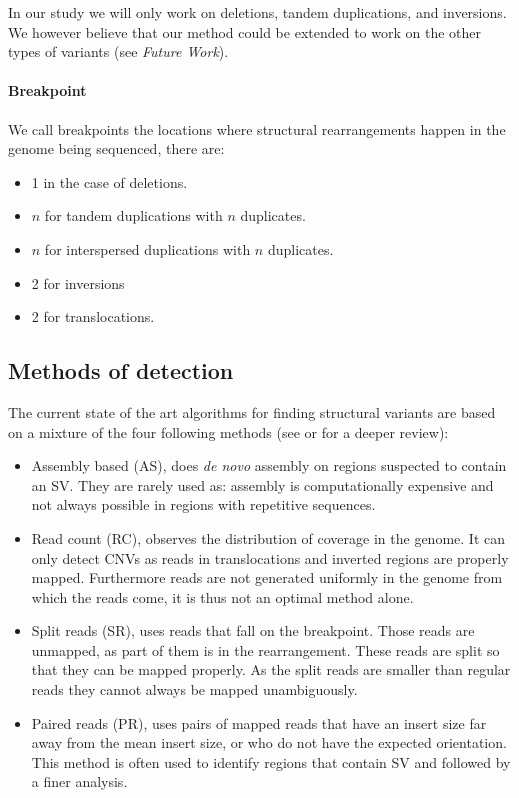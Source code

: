 \documentclass{article}
\begin{document}
In our study we will only work on deletions, tandem duplications, and inversions. We however believe that our method could be extended to work on the other types of variants (see \emph{Future Work}).

\paragraph{Breakpoint} We call breakpoints the locations where structural rearrangements happen in the genome being sequenced, there are:
\begin{itemize}
    \item 1 in the case of deletions.
    \item $n$ for tandem duplications with $n$ duplicates.
    \item $n$ for interspersed duplications with $n$ duplicates.
    \item 2 for inversions
    \item 2 for translocations.
\end{itemize}

\subsection{Methods of detection}

The current state of the art algorithms for finding structural variants are based on a mixture of the four following methods (see \cite{lin_making_2015} or \cite{sudmant_integrated_2015} for a deeper review):

\begin{itemize}
	\item Assembly based (AS), does \emph{de novo} assembly on regions suspected to contain an SV. They are rarely used as: assembly is computationally expensive and not always possible in regions with repetitive sequences.
	\item Read count (RC), observes the distribution of coverage in the genome. It can only detect CNVs as reads in translocations and inverted regions are properly mapped. Furthermore reads are not generated uniformly in the genome from which the reads come, it is thus not an optimal method alone.
	\item Split reads (SR), uses reads that fall on the breakpoint. Those reads are unmapped, as part of them is in the rearrangement. These reads are split so that they can be mapped properly. As the split reads are smaller than regular reads they cannot always be mapped unambiguously.
	\item Paired reads (PR), uses pairs of mapped reads that have an insert size far away from the mean insert size, or who do not have the expected orientation. This method is often used to identify regions that contain SV and followed by a finer analysis.
\end{itemize}
\end{document}
